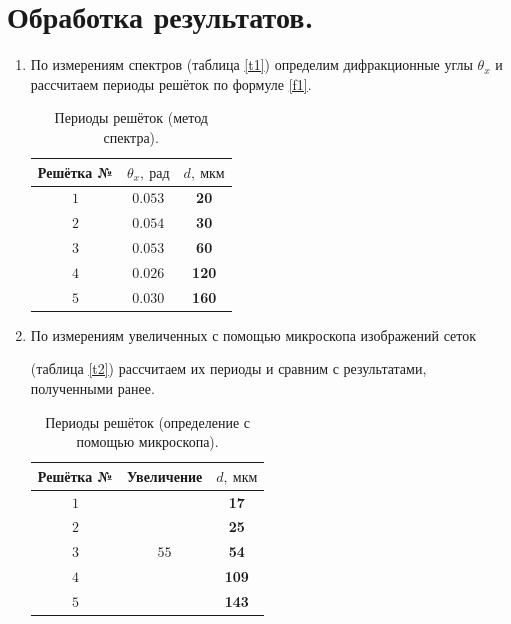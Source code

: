 \documentclass[a4paper, 12pt, twoside]{article}
\begin{document}
	\section{Обработка результатов.}
	\begin{enumerate}
		\item По измерениям спектров (таблица \ref{t1}) определим дифракционные углы $\theta_x$ и рассчитаем периоды решёток по формуле \eqref{f1}.
	

	\begin{table}[H]
		\centering
		\caption{Периоды решёток (метод спектра).}
		
		\begin{tabular}{c|c|c} \toprule
			Решётка № & $\theta_x,~\text{рад}$ & $d,~\text{мкм}$ \\ \midrule
			$1$       & $0.053$                & \textbf{20}            \\
			$2$       & $0.054$                & \textbf{30}            \\
			$3$       & $0.053$                & \textbf{60}            \\
			$4$       & $0.026$                & \textbf{120}           \\
			$5$       & $0.030$                & \textbf{160}          \\ \bottomrule
		\end{tabular}
	\end{table}

	\item По измерениям увеличенных с помощью микроскопа изображений сеток 
	
	(таблица \ref{t2}) рассчитаем их периоды и сравним с результатами, полученными ранее.
	

	\begin{table}[H]
		\centering
		\caption{Периоды решёток (определение с помощью микроскопа).}
		\label{t4}
		\begin{tabular}{c|c|c} \toprule
			Решётка № & Увеличение            & $d,~\text{мкм}$ \\ \midrule
			$1$       & \multirow{5}{*}{$55$} & \textbf{17}   \\
			$2$       &                       & \textbf{25}   \\
			$3$       &                       & \textbf{54}   \\
			$4$       &                       & \textbf{109}  \\ 
			$5$       &                       & \textbf{143} \\ \bottomrule
		\end{tabular}
	\end{table}


\end{enumerate}
\end{document}
